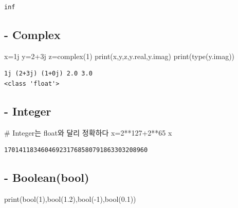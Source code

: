 \documentclass[
  a4paper,
  DIV=11,
  numbers=noendperiod]{scrreprt}
\newenvironment{Shaded}{\begin{snugshade}}{\end{snugshade}}
\newcommand{\BuiltInTok}[1]{\textcolor[rgb]{0.00,0.23,0.31}{#1}}
\newcommand{\CommentTok}[1]{\textcolor[rgb]{0.37,0.37,0.37}{#1}}
\newcommand{\DecValTok}[1]{\textcolor[rgb]{0.68,0.00,0.00}{#1}}
\newcommand{\FloatTok}[1]{\textcolor[rgb]{0.68,0.00,0.00}{#1}}
\newcommand{\NormalTok}[1]{\textcolor[rgb]{0.00,0.23,0.31}{#1}}
\newcommand{\OperatorTok}[1]{\textcolor[rgb]{0.37,0.37,0.37}{#1}}
\newcommand{\OtherTok}[1]{\textcolor[rgb]{0.00,0.23,0.31}{#1}}
\begin{document}
\begin{verbatim}
inf
\end{verbatim}

\subsection{- Complex}\label{complex}

\begin{Shaded}
\begin{Highlighting}[]
\NormalTok{x}\OperatorTok{=}\OtherTok{1j}
\NormalTok{y}\OperatorTok{=}\DecValTok{2}\OperatorTok{+}\OtherTok{3j}
\NormalTok{z}\OperatorTok{=}\BuiltInTok{complex}\NormalTok{(}\DecValTok{1}\NormalTok{)}
\BuiltInTok{print}\NormalTok{(x,y,z,y.real,y.imag)}
\BuiltInTok{print}\NormalTok{(}\BuiltInTok{type}\NormalTok{(y.imag))}
\end{Highlighting}
\end{Shaded}

\begin{verbatim}
1j (2+3j) (1+0j) 2.0 3.0
<class 'float'>
\end{verbatim}

\subsection{- Integer}\label{integer}

\begin{Shaded}
\begin{Highlighting}[]
\CommentTok{\# Integer는 float와 달리 정확하다}
\NormalTok{x}\OperatorTok{=}\DecValTok{2}\OperatorTok{**}\DecValTok{127}\OperatorTok{+}\DecValTok{2}\OperatorTok{**}\DecValTok{65} 
\NormalTok{x}
\end{Highlighting}
\end{Shaded}

\begin{verbatim}
170141183460469231768580791863303208960
\end{verbatim}

\subsection{- Boolean(bool)}\label{booleanbool}

\begin{Shaded}
\begin{Highlighting}[]
\BuiltInTok{print}\NormalTok{(}\BuiltInTok{bool}\NormalTok{(}\DecValTok{1}\NormalTok{),}\BuiltInTok{bool}\NormalTok{(}\FloatTok{1.2}\NormalTok{),}\BuiltInTok{bool}\NormalTok{(}\OperatorTok{{-}}\DecValTok{1}\NormalTok{),}\BuiltInTok{bool}\NormalTok{(}\FloatTok{0.1}\NormalTok{))}
\end{Highlighting}
\end{Shaded}
\end{document}
